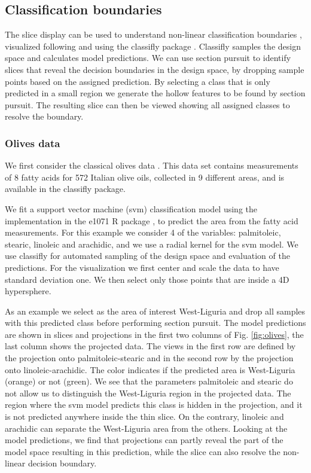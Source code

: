 \documentclass[]{interact}
\theoremstyle{plain}%
\theoremstyle{definition}
\theoremstyle{remark}
\begin{document}
\hypertarget{classification-boundaries}{%
\subsection{Classification boundaries}\label{classification-boundaries}}

The slice display can be used to understand non-linear classification
boundaries \citep{laa2019slice}, visualized following \citet{sam.11271}
and using the classifly package \citep{classifly}. Classifly samples the
design space and calculates model predictions. We can use section
pursuit to identify slices that reveal the decision boundaries in the
design space, by dropping sample points based on the assigned
prediction. By selecting a class that is only predicted in a small
region we generate the hollow features to be found by section pursuit.
The resulting slice can then be viewed showing all assigned classes to
resolve the boundary.

\hypertarget{olives-data}{%
\subsubsection{Olives data}\label{olives-data}}

We first consider the classical olives data \citep{olives}. This data
set contains measurements of 8 fatty acids for 572 Italian olive oils,
collected in 9 different areas, and is available in the classifly
package.

We fit a support vector machine (svm) classification model using the
implementation in the e1071 R package \citep{e1071}, to predict the area
from the fatty acid measurements. For this example we consider 4 of the
variables: palmitoleic, stearic, linoleic and arachidic, and we use a
radial kernel for the svm model. We use classifly for automated sampling
of the design space and evaluation of the predictions. For the
visualization we first center and scale the data to have standard
deviation one. We then select only those points that are inside a 4D
hypersphere.

As an example we select as the area of interest West-Liguria and drop
all samples with this predicted class before performing section pursuit.
The model predictions are shown in slices and projections in the first
two columns of Fig. \ref{fig:olives}, the last column shows the
projected data. The views in the first row are defined by the projection
onto palmitoleic-stearic and in the second row by the projection onto
linoleic-arachidic. The color indicates if the predicted area is
West-Liguria (orange) or not (green). We see that the parameters
palmitoleic and stearic do not allow us to distinguish the West-Liguria
region in the projected data. The region where the svm model predicts
this class is hidden in the projection, and it is not predicted anywhere
inside the thin slice. On the contrary, linoleic and arachidic can
separate the West-Liguria area from the others. Looking at the model
predictions, we find that projections can partly reveal the part of the
model space resulting in this prediction, while the slice can also
resolve the non-linear decision boundary.
\end{document}
